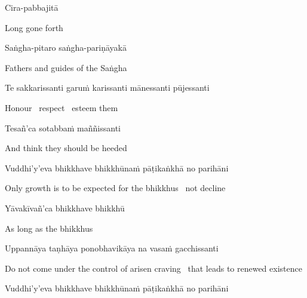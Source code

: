Cira-pabbajitā

\begin{english}
  Long gone forth
\end{english}

Saṅgha-pitaro saṅgha-pariṇāyakā

\begin{english}
  Fathers and guides of the Saṅgha
\end{english}

\begin{pali-hang}
Te sakkarissanti garuṁ karissanti mānessanti pūjessanti
\end{pali-hang}

\begin{english}
  Honour \breathmark\ respect \breathmark\ esteem them
\end{english}

Tesañ'ca sotabbaṁ maññissanti

\begin{english}
  And think they should be heeded
\end{english}

\begin{pali-hang}
Vuddhi'y'eva bhikkhave bhikkhūnaṁ pāṭikaṅkhā no parihāni
\end{pali-hang}

\begin{english-hang}
  Only growth is to be expected for the bhikkhus \breathmark\ not decline
\end{english-hang}

Yāvakīvañ'ca bhikkhave bhikkhū

\ifbfive\enlargethispage{1\baselineskip}\fi

\begin{english}
  As long as the bhikkhus
\end{english}

\ifninebythirteen\clearpage\fi

\begin{pali-hang}
Uppannāya taṇhāya ponobhavikāya na vasaṁ gacchissanti
\end{pali-hang}

\begin{english-hang}
  Do not come under the control of arisen craving \breathmark\ that leads to renewed existence
\end{english-hang}

\begin{pali-hang}
Vuddhi'y'eva bhikkhave bhikkhūnaṁ pāṭikaṅkhā no parihāni
\end{pali-hang}


